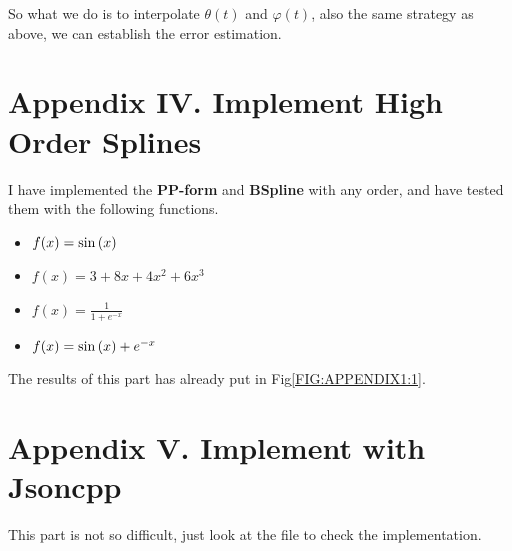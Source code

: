 \documentclass[a4paper]{article}
\begin{document}
So what we do is to interpolate $\theta(t)$ and $\varphi(t)$, also the same strategy as above, we can establish the error estimation.

\section{Appendix IV. Implement High Order Splines}

I have implemented the \textbf{PP-form} and \textbf{BSpline} with any order, and have tested them with the following functions. 
\begin{itemize}
    \item $f(x) = \sin\qty(x)$ 
    \item $f(x) = 3+8x+4x^2+6x^3$
    \item $f(x) = \frac{1}{1 + e^{-x}}$
    \item $f(x) = \sin\qty(x) + e^{-x}$
\end{itemize}

The results of this part has already put in Fig\ref{FIG:APPENDIX1:1}.

\section{Appendix V. Implement with Jsoncpp}
This part is not so difficult, just look at the file  to check the implementation.
\end{document}
